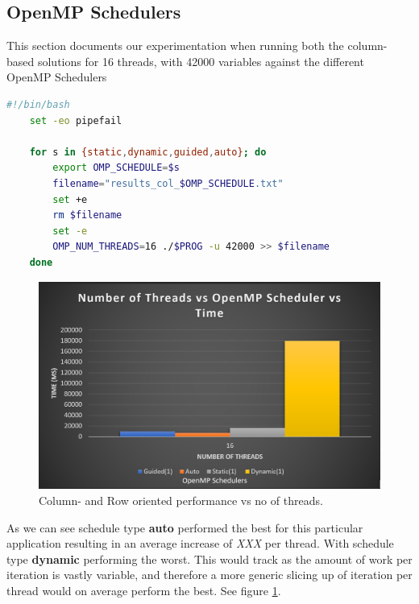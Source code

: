\subsection{OpenMP Schedulers}
  This section documents our experimentation when running both the column-based solutions for 16 threads, with 42000 variables against the different OpenMP Schedulers
  \begin{lstlisting}[language=bash]
    #!/bin/bash
    set -eo pipefail

    for s in {static,dynamic,guided,auto}; do
        export OMP_SCHEDULE=$s
        filename="results_col_$OMP_SCHEDULE.txt"
        set +e
        rm $filename
        set -e
        OMP_NUM_THREADS=16 ./$PROG -u 42000 >> $filename
    done
  \end{lstlisting}
  \begin{figure}
    \centering
    \includegraphics[width=\linewidth]{Figures/col42000.png}
    \caption{Column- and Row oriented performance vs no of threads.}
    \label{fig:col42}
  \end{figure}

  As we can see schedule type \textbf{auto} performed the best for this particular application resulting in an average increase of \textit{XXX} per thread. 
  With schedule type \textbf{dynamic} performing the worst. 
  This would track as the amount of work per iteration is vastly variable, and therefore a more generic slicing up of iteration per thread would on average perform the best.
  See figure \ref{fig:col42}.